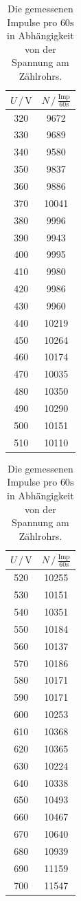\begin{table}
  \centering
  \caption{Die gemessenen Impulse pro $60\si{\second}$ in Abhängigkeit von der Spannung am Zählrohrs.}
  \begin{tabular}[t]{cc}
    \toprule
    $U \, /\, \si{\V}$ & $N \,/\, \frac{\text{Imp}}{\si{60\second}}$\\
    \midrule
    320 & 9672    \\
    330 & 9689    \\
    340 & 9580    \\
    350 & 9837    \\
    360 & 9886    \\
    370 & 10041   \\
    380 & 9996    \\
    390 & 9943    \\
    400 & 9995    \\
    410 & 9980    \\
    420 & 9986    \\
    430 & 9960    \\
    440 & 10219   \\
    450 & 10264   \\
    460 & 10174   \\
    470 & 10035   \\
    480 & 10350   \\
    490 & 10290   \\
    500 & 10151   \\
    510 & 10110   \\
    \bottomrule
  \end{tabular}
  \begin{tabular}[t]{cc}
    \toprule
    $U \, /\, \si{\V}$ & $N \,/\, \frac{\text{Imp}}{\si{60\second}}$\\
    \midrule
    520 & 10255   \\
    530 & 10151   \\
    540 & 10351   \\
    550 & 10184   \\
    560 & 10137   \\
    570 & 10186   \\
    580 & 10171   \\
    590 & 10171   \\
    600 & 10253   \\
    610 & 10368   \\
    620 & 10365   \\
    630 & 10224   \\
    640 & 10338   \\
    650 & 10493   \\
    660 & 10467   \\
    670 & 10640   \\
    680 & 10939   \\
    690 & 11159   \\
    700 & 11547   \\
    \bottomrule
  \end{tabular}
\label{tab:imps}
\end{table}
\FloatBarrier
